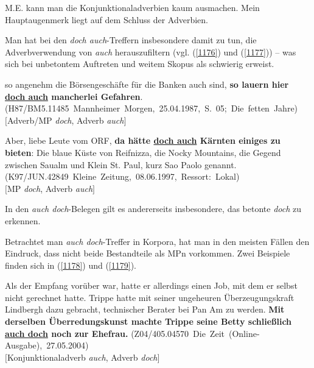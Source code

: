 {M.E. kann man die Konjunktionaladverbien kaum ausmachen. Mein Hauptau\-genmerk liegt auf dem Schluss der Adverbien.

Man hat bei den \textit{doch auch}-Treffern insbesondere damit zu tun, die Adverbverwendung von \textit{auch} herauszufiltern (vgl. (\ref{1176}) und (\ref{1177})) – was sich bei unbetontem Auftreten und weitem Skopus als schwierig erweist.

\begin{exe}
	\ex\label{1176} 
	\scriptsize
	{so angenehm die Börsengeschäfte für die Banken auch sind, \textbf{so lauern hier \underline{doch auch} mancherlei Gefahren}.
	\hfill\hbox{(H87/BM5.11485 Mannheimer Morgen, 25.04.1987, S. 05; Die fetten Jahre)}}\\
	$[$Adverb/MP \textit{doch}, Adverb \textit{auch}$]$
\end{exe}

\begin{exe}
	\ex\label{1177} 
	\scriptsize
	{Aber, liebe Leute vom ORF, \textbf{da hätte \underline{doch auch} Kärnten einiges zu bieten}: Die blaue Küste von Reifnizza, die Nocky Mountains, die 		Gegend zwischen Saualm und Klein St. Paul, kurz Sao Paolo genannt. 
	\hfill\hbox{(K97/JUN.42849 Kleine Zeitung, 08.06.1997, Ressort: Lokal)}}\\	
	$[$MP \textit{doch}, Adverb \textit{auch}$]$
\end{exe}	
In den \textit{auch doch}-Belegen gilt es andererseits insbesondere, das betonte \textit{doch} zu erkennen. 

Betrachtet man \textit{auch doch}-Treffer in Korpora, hat man in den meisten Fällen den Eindruck, dass nicht beide Bestandteile als MPn vorkommen. Zwei Beispiele finden sich in (\ref{1178}) und (\ref{1179}). 

\begin{exe}
	\ex\label{1178} 
	\scriptsize
	{Als der Empfang vorüber war, hatte er allerdings einen Job, mit dem er selbst nicht gerechnet hatte. Trippe hatte mit seiner ungeheuren 					Überzeugungskraft Lindbergh dazu gebracht, \glqq techni\-scher Berater\grqq{} bei Pan Am zu werden. \textbf{Mit derselben Überredungskunst machte Trippe 		seine Betty schließlich \underline{auch doch} noch zur Ehefrau.}
	\hfill\hbox{(Z04/405.04570 Die Zeit (Online-Ausgabe), 27.05.2004)}}\\	
	$[$Konjunktionaladverb \textit{auch}, Adverb \textit{doch}$]$
\end{exe}

}
